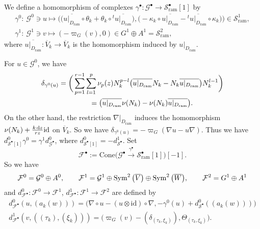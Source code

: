 \documentclass[pdftex]{sigma}
\numberwithin{equation}{section}
\newcommand{\Sym}{\mathop{\rm Sym}\nolimits}
\begin{document}
We define a homomorphism of complexes
$\gamma^{\bullet} \colon {\mathcal G}^{\bullet}
\longrightarrow {\mathcal S}^{\bullet}_{\mathrm{ram}}[1]$
by
\begin{gather}
 \gamma^0 \colon \ {\mathcal G}^0 \ni u
 \mapsto
\big(
 \big( \overline { u|_{D_{\mathrm{ram}}} }\circ\theta_k
 + \theta_k\circ {}^t \overline { u|_{D_{\mathrm{ram}}} } \big) ,
 \big( {-}\kappa_k\circ \overline { u|_{D_{\mathrm{ram}}} }
 - {} ^t \overline { u|_{D_{\mathrm{ram}}} } \circ \kappa_k \big)
 \big)
 \in
 {\mathcal S}^1_{\mathrm{ram}},\nonumber
 \\
 \gamma^1 \colon \ {\mathcal G}^1 \ni v
 \mapsto
 (-\varpi_G(v),0)
 \in G^1\oplus A^1={\mathcal S}^2_{\mathrm{ram}}, \label{equation: chain map from G to S}
\end{gather}
where
$\overline{u|_{D_{\mathrm{ram}}}} \colon \overline{V}_k
\longrightarrow \overline{V}_k$
is the homomorphism induced by $u|_{D_{\mathrm{ram}}}$.

For $u\in {\mathcal G}^0$,
we have
\begin{gather*}
 \delta_{\gamma^0(u)}
 =
 \bigg( \sum_{p=1}^{r-1} \sum_{l=1}^p \nu_p(z)
 N_k^{p-l}\big(\overline{u|_{D_{\mathrm{ram}}}} N_k-N_k \overline{u|_{D_{\mathrm{ram}}}} \big) N_k^{l-1} \bigg)\\
 \hphantom{\delta_{\gamma^0(u)}}{}
 =
 \big( \overline{u|_{D_{\mathrm{ram}}}} \nu(N_k)-\nu(N_k) \overline{u|_{D_{\mathrm{ram}}}} \big).
\end{gather*}
On the other hand, the restriction
$\nabla|_{D_{\mathrm{ram}}}$ induces the homomorphism
$\nu(N_k)+\frac{k\,{\rm d}z}{rz}\mathrm{id}$ on $\overline{V}_k$.
So we have
$\delta_{\gamma^0(u)}=-\varpi_G(\nabla u-u\nabla)$.
Thus we have
$d_{{\mathcal S}^{\bullet}[1]}^0\gamma^0=\gamma^1 d_{{\mathcal G}^{\bullet}}^0$,
where $d_{{\mathcal S}^{\bullet}[1]}^0=-d^1_{{\mathcal S}^{\bullet}}$.
Set
\begin{equation} \label{equation: definition of tangent complex}
 {\mathcal F}^{\bullet}
 :=
 \mathrm{Cone} \big( {\mathcal G}^{\bullet} \xrightarrow {\gamma^{\bullet}}
 {\mathcal S}^{\bullet}_{\mathrm{ram}}[1] \big) [-1].
\end{equation}
So we have
\begin{gather*}
 {\mathcal F}^0
=
 {\mathcal G}^0\oplus A^0,
 \qquad
 {\mathcal F}^1
 =
 {\mathcal G}^1\oplus \Sym^2\big(\overline{V}\big)\oplus \Sym^2\big(\overline{W}\big),
 \qquad
 {\mathcal F}^2
=
 G^1\oplus A^1
\end{gather*}
and $d^0_{{\mathcal F}^{\bullet}}\colon {\mathcal F}^0 \longrightarrow {\mathcal F}^1$,
$d^1_{{\mathcal F}^{\bullet}}\colon {\mathcal F}^1 \longrightarrow {\mathcal F}^2$
are defined by
\begin{gather*}
 d^0_{{\mathcal F}^{\bullet}} ( u, (a_k(w)) )
 =
 \big(\nabla\circ u-(u\otimes\mathrm{id})\circ \nabla ,
 -\gamma^0(u)+d^0_{{\mathcal S}^{\bullet}}((a_k(w))) \big)
 \\
 d^1_{{\mathcal F}^{\bullet}} ( v, ( (\tau_k),(\xi_k) ) )
 =
 \big(\varpi_G(v)-(\delta_{(\tau_k,\xi_k)}) , \Theta_{(\tau_k,\xi_k)} \big).
\end{gather*}
\end{document}
